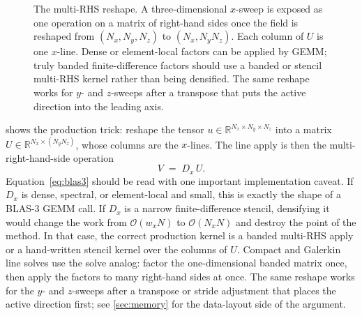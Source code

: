 \documentclass[11pt]{article}
\newcommand{\Dx}{D_{x}}
\newcommand{\R}{\mathbb{R}}
\newcommand{\bigO}{\mathcal{O}}
\newcommand{\Nall}{N}
\begin{document}
\begin{figure}[t]
{}
  \caption{The multi-RHS reshape.  A three-dimensional $x$-sweep is
  exposed as one operation on a matrix of right-hand sides once the
  field is reshaped from $(N_x, N_y, N_z)$ to $(N_x, N_yN_z)$.  Each
  column of $U$ is one $x$-line.  Dense or element-local factors can be
  applied by GEMM; truly banded finite-difference factors should use a
  banded or stencil multi-RHS kernel rather than being densified.  The
  same reshape works for $y$- and $z$-sweeps after a transpose that
  puts the active direction into the leading axis.}
  \label{fig:blas3}
\end{figure}

 shows the production trick: reshape the tensor
$u \in \R^{N_x \times N_y \times N_z}$ into a matrix
$U \in \R^{N_x \times (N_y N_z)}$, whose columns are the $x$-lines.
The line apply is then the multi-right-hand-side operation
\begin{equation}
\label{eq:blas3}
  V \;=\; \Dx\, U.
\end{equation}
Equation~\eqref{eq:blas3} should be read with one important
implementation caveat.  If $\Dx$ is dense, spectral, or element-local
and small, this is exactly the shape of a BLAS-3 GEMM call.  If $\Dx$
is a narrow finite-difference stencil, densifying it would change the
work from $\bigO(w_x\Nall)$ to $\bigO(N_x\Nall)$ and destroy the
point of the method.  In that case, the correct production kernel is a
banded multi-RHS apply or a hand-written stencil kernel over the
columns of $U$.  Compact and Galerkin line solves use the solve analog:
factor the one-dimensional banded matrix once, then apply the factors
to many right-hand sides at once.  The same reshape works for the
$y$- and $z$-sweeps after a transpose or stride adjustment that places
the active direction first; see \cref{sec:memory} for the data-layout
side of the argument.
\end{document}
